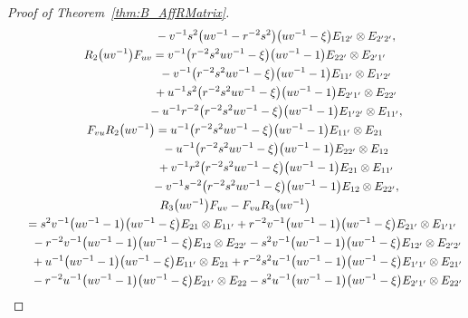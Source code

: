 \documentclass[10pt,a4paper]{amsart}
\numberwithin{equation}{section}
\begin{document}
\begin{proof}[Proof of Theorem~\ref{thm:B_AffRMatrix}]
\begin{gather*}
 \hphantom{F_{vu}R_{1}\bigl(uv^{-1}\bigr) =}{}
 - v^{-1}s^{2}\bigl(uv^{-1} - r^{-2}s^{2}\bigr)\bigl(uv^{-1} - \xi\bigr)E_{12'} \otimes E_{2'2'},
\\
 R_{2}\bigl(uv^{-1}\bigr)F_{uv} = v^{-1}\bigl(r^{-2}s^{2}uv^{-1} - \xi\bigr)\bigl(uv^{-1} - 1\bigr)E_{22'} \otimes E_{2'1'} \\
 \hphantom{R_{2}\bigl(uv^{-1}\bigr)F_{uv} = }{}
 - v^{-1}\bigl(r^{-2}s^{2}uv^{-1} - \xi\bigr)\bigl(uv^{-1} - 1\bigr)E_{11'} \otimes E_{1'2'} \\
 \hphantom{R_{2}\bigl(uv^{-1}\bigr)F_{uv} = }{}
 +u^{-1}s^{2}\bigl(r^{-2}s^{2}uv^{-1} - \xi\bigr)\bigl(uv^{-1} - 1\bigr)E_{2'1'} \otimes E_{22'} \\
 \hphantom{R_{2}\bigl(uv^{-1}\bigr)F_{uv} = }{}
 - u^{-1}r^{-2}\bigl(r^{-2}s^{2}uv^{-1} - \xi\bigr)\bigl(uv^{-1} - 1\bigr)E_{1'2'} \otimes E_{11'},
\\
 F_{vu}R_{2}\bigl(uv^{-1}\bigr) = u^{-1}\bigl(r^{-2}s^{2}uv^{-1} - \xi\bigr)\bigl(uv^{-1} - 1\bigr)E_{11'} \otimes E_{21}\\
 \hphantom{ F_{vu}R_{2}\bigl(uv^{-1}\bigr) =}{}
 - u^{-1}\bigl(r^{-2}s^{2}uv^{-1} - \xi\bigr)\bigl(uv^{-1} - 1\bigr)E_{22'} \otimes E_{12} \\
 \hphantom{ F_{vu}R_{2}\bigl(uv^{-1}\bigr) =}{}
 + v^{-1}r^{2}\bigl(r^{-2}s^{2}uv^{-1} - \xi\bigr)\bigl(uv^{-1} - 1\bigr)E_{21} \otimes E_{11'} \\
 \hphantom{ F_{vu}R_{2}\bigl(uv^{-1}\bigr) =}{}
 - v^{-1}s^{-2}\bigl(r^{-2}s^{2}uv^{-1} - \xi\bigr)\bigl(uv^{-1} - 1\bigr)E_{12} \otimes E_{22'},
\\
 R_{3}\bigl(uv^{-1}\bigr)F_{uv} - F_{vu}R_{3}\bigl(uv^{-1}\bigr) \\
\quad{} = s^{2}v^{-1}\bigl(uv^{-1} - 1\bigr)\bigl(uv^{-1} - \xi\bigr)E_{21} \otimes E_{11'}+ r^{-2}v^{-1}\bigl(uv^{-1} - 1\bigr)\bigl(uv^{-1} - \xi\bigr)E_{21'} \otimes E_{1'1'} \\
\qquad{} -r^{-2}v^{-1}\bigl(uv^{-1} - 1\bigr)\bigl(uv^{-1} - \xi\bigr)E_{12} \otimes E_{22'} - s^{2}v^{-1}\bigl(uv^{-1} - 1\bigr)\bigl(uv^{-1} - \xi\bigr)E_{12'} \otimes E_{2'2'} \\
\qquad{} + u^{-1}\bigl(uv^{-1} - 1\bigr)\bigl(uv^{-1} - \xi\bigr)E_{11'} \otimes E_{21}+r^{-2}s^{2}u^{-1}\bigl(uv^{-1} - 1\bigr)\bigl(uv^{-1} - \xi\bigr)E_{1'1'} \otimes E_{21'} \\
\qquad{}- r^{-2}u^{-1}\bigl(uv^{-1} - 1\bigr)\bigl(uv^{-1} - \xi\bigr)E_{21'} \otimes E_{22} - s^{2}u^{-1}\bigl(uv^{-1} - 1\bigr)\bigl(uv^{-1} - \xi\bigr)E_{2'1'} \otimes E_{22'} \\

\end{gather*}
\end{proof}
\end{document}

